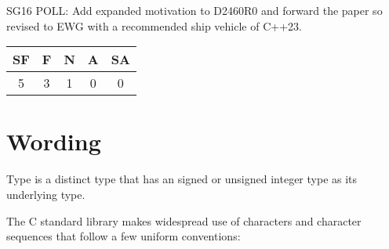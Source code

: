 \documentclass{wg21}
\begin{document}
\begin{quoteblock}
SG16 POLL: Add expanded motivation to D2460R0 and forward the paper so
revised to EWG with a recommended ship vehicle of C++23.
    
\begin{tabular}{|c|c|c|c|c|}
    \hline
    SF & F & N & A & SA\\
    \hline
     5 & 3 & 1 & 0 & 0 \\
    \hline
\end{tabular}
\end{quoteblock}



\section{Wording}


\pnum
{}%
%
%
Type  is a distinct type that has
an 
signed or unsigned integer type as its underlying type.



The C standard library makes widespread use of characters and character sequences that follow a few uniform conventions:
\end{document}

